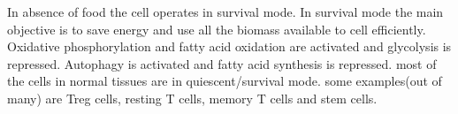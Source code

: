 In absence of food the cell operates in survival mode. In survival mode the main objective is to save energy and use all the biomass available to cell efficiently.
Oxidative phosphorylation and fatty acid oxidation are activated and glycolysis is repressed.
Autophagy is activated and fatty acid synthesis is repressed. most of the cells in normal tissues are in quiescent/survival mode.
some examples(out of many) are Treg cells, resting T cells, memory T cells and stem cells.